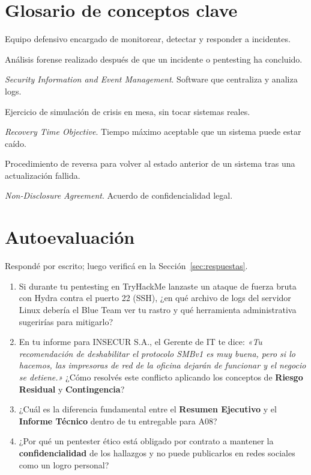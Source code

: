 \documentclass[11pt,a4paper]{article}
\begin{document}
\section{Glosario de conceptos clave}
\begin{description}[leftmargin=!, labelwidth=3.5cm, font=\bfseries]
  \item[Blue Team] Equipo defensivo encargado de monitorear, detectar y responder a incidentes.
  \item[Post-Mortem] Análisis forense realizado después de que un incidente o pentesting ha concluido.
  \item[SIEM] \textit{Security Information and Event Management}. Software que centraliza y analiza logs.
  \item[Tabletop] Ejercicio de simulación de crisis en mesa, sin tocar sistemas reales.
  \item[RTO] \textit{Recovery Time Objective}. Tiempo máximo aceptable que un sistema puede estar caído.
  \item[Rollback] Procedimiento de reversa para volver al estado anterior de un sistema tras una actualización fallida.
  \item[NDA] \textit{Non-Disclosure Agreement}. Acuerdo de confidencialidad legal.
\end{description}

\section{Autoevaluación}\label{sec:autoeval}
Respondé por escrito; luego verificá en la Sección~\ref{sec:respuestas}.

\begin{enumerate}[leftmargin=*]
  \item Si durante tu pentesting en TryHackMe lanzaste un ataque de fuerza bruta con Hydra contra el puerto 22 (SSH), ¿en qué archivo de logs del servidor Linux debería el Blue Team ver tu rastro y qué herramienta administrativa sugerirías para mitigarlo?
  \item En tu informe para INSECUR S.A., el Gerente de IT te dice: \textit{«Tu recomendación de deshabilitar el protocolo SMBv1 es muy buena, pero si lo hacemos, las impresoras de red de la oficina dejarán de funcionar y el negocio se detiene.»} ¿Cómo resolvés este conflicto aplicando los conceptos de \textbf{Riesgo Residual} y \textbf{Contingencia}?
  \item ¿Cuál es la diferencia fundamental entre el \textbf{Resumen Ejecutivo} y el \textbf{Informe Técnico} dentro de tu entregable para A08?
  \item ¿Por qué un pentester ético está obligado por contrato a mantener la \textbf{confidencialidad} de los hallazgos y no puede publicarlos en redes sociales como un logro personal?
\end{enumerate}
\end{document}
